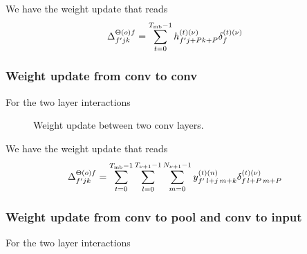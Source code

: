 We have the weight update that reads
\begin{align}
\Delta^{\Theta(o)f}_{f'jk}&=\sum_{t=0}^{T_{{\rm mb}}-1} h^{(t)(\nu)}_{f'j+Pk+P}\delta^{(t)(\nu)}_f
\end{align}

\subsubsection{Weight update from conv to conv}

For the two layer interactions

\begin{figure}[H]
\begin{center}
\caption{Weight update between two conv layers.}
\end{center}
\end{figure}

We have the weight update that reads
\begin{align}
\Delta^{\Theta(o)f}_{f'jk}&=\sum_{t=0}^{T_{{\rm mb}}-1}\sum^{T_{\nu+1}-1}_{l=0}\sum^{N_{\nu+1}-1}_{m=0}
%
y^{(t)(n)}_{f'\,l+j\,m+k}\delta_{f\,l+P\,m+P}^{(t)(\nu)}
\end{align}

\subsubsection{Weight update from conv to pool and conv to input}

For the two layer interactions

